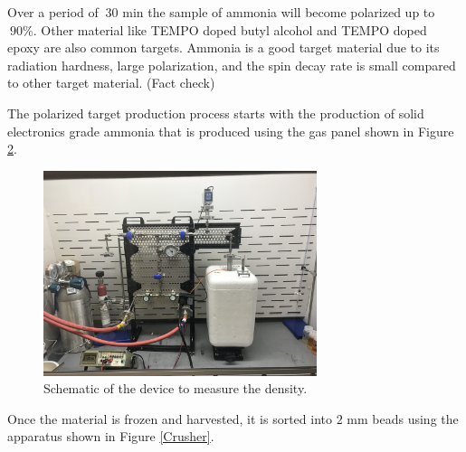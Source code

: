 \documentclass[12pt,notitlepage]{amsart}
\begin{document}
 
Over a period of $~30$ min the sample of ammonia will become polarized up to $~90\%$.  Other material like TEMPO doped butyl alcohol and TEMPO doped epoxy are also common targets. Ammonia is a good target material due to its radiation hardness, large polarization, and the spin decay rate is small compared to other target material. (Fact check) \cite{karl}  
\begin{figure}[h]
\label{procedure}
\end{figure}  
The polarized target production process starts with the production of solid electronics grade ammonia that is produced using the gas panel shown in Figure \ref{gaspanel}.
\begin{figure}[ht]
\caption{Schematic of the device to measure the density.}
\label{gaspanel}
\centering
\includegraphics[width = 8cm,height = 6cm]{Gas_Panel} 
\end{figure}
Once the material is frozen and harvested, it is sorted into $2$ mm beads using the apparatus shown in Figure \ref{Crusher}. 
\end{document}
